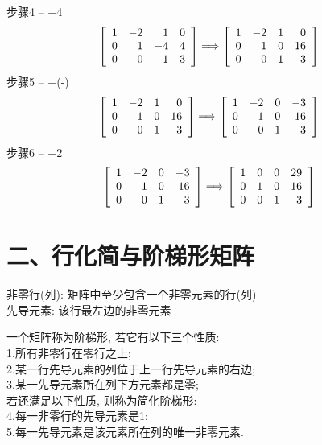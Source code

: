步骤4 -- +4
\[\left[\begin{array}{r r r r}
    1 & -2 & 1 & 0\\
    0 & 1 & -4 & 4\\
    0 & 0 & 1 & 3
\end{array}\right] \Longrightarrow \left[\begin{array}{r r r r}
	1 & -2 & 1 & 0\\
	0 & 1 & 0 & 16\\
	0 & 0 & 1 & 3
\end{array}\right]\]
步骤5 -- +(-)
\[\left[\begin{array}{r r r r}
    1 & -2 & 1 & 0\\
    0 & 1 & 0 & 16\\
    0 & 0 & 1 & 3
\end{array}\right] \Longrightarrow \left[\begin{array}{r r r r}
	1 & -2 & 0 & -3\\
	0 & 1 & 0 & 16\\
	0 & 0 & 1 & 3
\end{array}\right]\]
步骤6 -- +2
\[\left[\begin{array}{r r r r}
    1 & -2 & 0 & -3\\
    0 & 1 & 0 & 16\\
    0 & 0 & 1 & 3
\end{array}\right] \Longrightarrow \left[\begin{array}{r r r r}
	1 & 0 & 0 & 29\\
	0 & 1 & 0 & 16\\
	0 & 0 & 1 & 3
\end{array}\right]\]
\vspace{6ex}

\section{二、行化简与阶梯形矩阵}
非零行(列): 矩阵中至少包含一个非零元素的行(列)\\
先导元素: 该行最左边的非零元素\\
\begin{definition}
一个矩阵称为阶梯形, 若它有以下三个性质:\\
1.所有非零行在零行之上;\\
2.某一行先导元素的列位于上一行先导元素的右边;\\
3.某一先导元素所在列下方元素都是零;\\
若还满足以下性质, 则称为简化阶梯形:\\
4.每一非零行的先导元素是1;\\
5.每一先导元素是该元素所在列的唯一非零元素.
\end{definition}\vspace{2ex}

